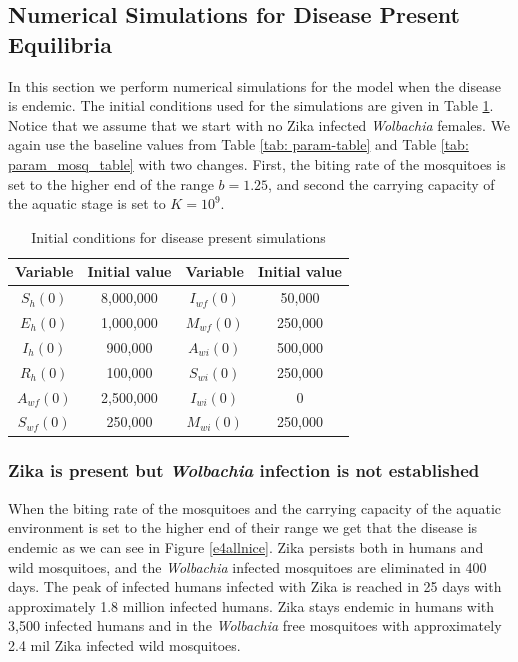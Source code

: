 \documentclass{ws-rv9x6}
\begin{document}
\subsection{Numerical Simulations for Disease Present Equilibria}
In this section we perform numerical simulations for the model when the disease is endemic. 
The initial conditions used for the simulations are given in Table \ref{init-cond-dis-present-table}. Notice that we assume that we start with no Zika infected \textit{Wolbachia} females. We again use the baseline values from Table \ref{tab: param-table} and Table \ref{tab: param_mosq_table}  with two changes. First, the biting rate of the mosquitoes is set to the higher end of the range $b=1.25$, and second the carrying capacity of the aquatic stage is set to $K=10^9$. 

\begin{table}[H]
\centering
\caption{Initial conditions for disease present simulations
} 
\label{init-cond-dis-present-table}
\begin{tabular}{ c c c c} 
 \toprule
 Variable & Initial value & Variable & Initial value\\ 
  \midrule
 $S_h(0)$ & 8,000,000 & $I_{wf}(0)$ & 50,000\\
 $E_h(0)$ & 1,000,000 & $M_{wf}(0)$ & 250,000\\
 $I_h(0)$ & 900,000 & $A_{wi}(0)$ & 500,000 \\
 $R_h(0)$ & 100,000 & $S_{wi}(0)$ & 250,000 \\
 $A_{wf}(0)$ & 2,500,000 & $I_{wi}(0)$ & 0 \\
 $S_{wf}(0)$ & 250,000 & $M_{wi}(0)$ & 250,000\\
 \bottomrule
\end{tabular}
\end{table}
\subsubsection{Zika is present but \textit{Wolbachia} infection is not established \label{disfirst}}
When the biting rate of the mosquitoes and the carrying capacity of the aquatic environment is set to the higher end of their range we get that the disease is endemic as we can see in Figure \ref{e4allnice}.  Zika persists both in humans and wild mosquitoes, and the \textit{Wolbachia} infected mosquitoes are eliminated in 400 days. The peak of infected humans infected with Zika is reached in 25 days with approximately 1.8 million infected humans. Zika stays endemic in humans with 3,500 infected humans  and in the \textit{Wolbachia} free mosquitoes with approximately 2.4 mil Zika infected wild mosquitoes.
\end{document}
